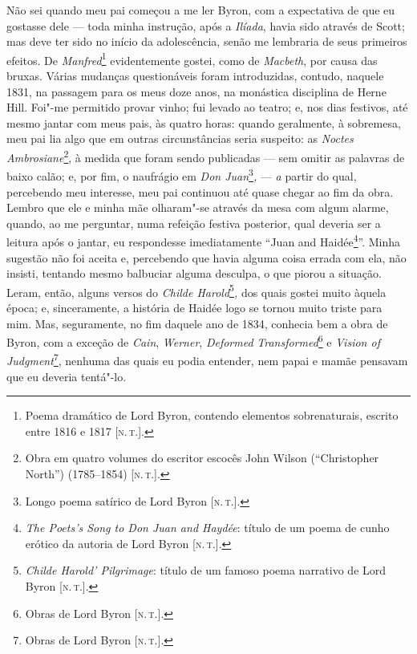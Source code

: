 Não sei quando meu pai começou a me ler Byron, com a expectativa de que
eu gostasse dele --- toda minha instrução, após a \emph{Ilíada}, havia
sido através de Scott; mas deve ter sido no início da adolescência,
senão me lembraria de seus primeiros efeitos. De
\emph{Manfred}\footnote{Poema dramático de Lord Byron, contendo
  elementos sobrenaturais, escrito entre 1816 e 1817 {[}\textsc{n.\,t.}{]}.}
evidentemente gostei, como de \emph{Macbeth}, por causa das bruxas.
Várias mudanças questionáveis foram introduzidas, contudo, naquele 1831,
na passagem para os meus doze anos, na monástica disciplina de Herne
Hill. Foi"-me permitido provar vinho; fui levado ao teatro; e, nos dias
festivos, até mesmo jantar com meus pais, às quatro horas: quando
geralmente, à sobremesa, meu pai lia algo que em outras circunstâncias
seria suspeito: as \emph{Noctes} \emph{Ambrosiane}\footnote{Obra em
  quatro volumes do escritor escocês John Wilson (``Christopher North'')
  (1785--1854) {[}\textsc{n.\,t.}{]}.}, à medida que foram sendo publicadas ---
sem omitir as palavras de baixo calão; e, por fim, o naufrágio em
\emph{Don Juan}\footnote{Longo poema satírico de Lord Byron {[}\textsc{n.\,t.}{]}.}\emph{,} --- \emph{a} partir do qual, percebendo meu interesse,
meu pai continuou até quase chegar ao fim da obra. Lembro que ele e
minha mãe olharam"-se através da mesa com algum alarme, quando, ao me
perguntar, numa refeição festiva posterior, qual deveria ser a leitura
após o jantar, eu respondesse imediatamente ``Juan and Haidée\footnote{\emph{The
  Poets's Song to Don Juan and Haydée}: título de um poema de cunho
  erótico da autoria de Lord Byron {[}\textsc{n.\,t.}{]}.}''. Minha sugestão
não foi aceita e, percebendo que havia alguma coisa errada com ela, não
insisti, tentando mesmo balbuciar alguma desculpa, o que piorou a
situação. Leram, então, alguns versos do \emph{Childe Harold}\footnote{\emph{Childe
  Harold' Pilgrimage}: título de um famoso poema narrativo de Lord Byron
  {[}\textsc{n.\,t.}{]}.}\emph{,} dos quais gostei muito àquela época; e,
sinceramente, a história de Haidée logo se tornou muito triste para mim.
Mas, seguramente, no fim daquele ano de 1834, conhecia bem a obra de
Byron, com a exceção de \emph{Cain}, \emph{Werner}, \emph{Deformed}
\emph{Transformed}\footnote{Obras de Lord Byron {[}\textsc{n.\,t.}{]}.} e
\emph{Vision of Judgment}\footnote{Obras de Lord Byron {[}\textsc{n.\,t.}{]}.},
nenhuma das quais eu podia entender, nem papai e mamãe pensavam que eu
deveria tentá"-lo.

